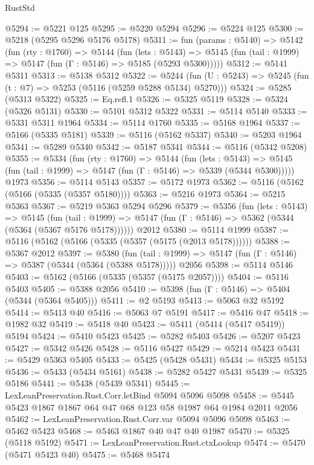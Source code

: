 \begin{lexlean}{RustStd}
\begin{coremodule}
{\begin{coremodule}
{{{{{{{{{{{{{{{{{{{{{{{{{{{{{{{@5294 := @5221 @125
@5295 := @5220 @5294
@5296 := @5224 @125
@5300 := @5218 (@5295 @5296 @5176 @5178)
@5311 := fun (params : @5140) =>
  @5142
    (fun (rty : @1760) =>
    @5144
      (fun (lets : @5143) =>
      @5145 (fun (tail : @1999) => @5147 (fun (Γ : @5146) => @5185 (@5293 @5300)))))
@5312 := @5141 @5311
@5313 := @5138 @5312
@5322 := @5244 (fun (U : @5243) => @5245 (fun (t : @7) => @5253 (@5116 (@5259 @5288 @5134) @5270)))
@5324 := @5285 (@5313 @5322)
@5325 := Eq.refl.{1}
@5326 := @5325 @5119
@5328 := @5324 (@5326 @5131)
@5330 := @5101 @5312 @5322
@5331 := @5114 @5140
@5333 := @5331 @5311 @1964
@5334 := @5114 @1760
@5335 := @5168 @1964
@5337 := @5166 (@5335 @5181)
@5339 := @5116 (@5162 @5337)
@5340 := @5203 @1964
@5341 := @5289 @5340
@5342 := @5187 @5341
@5344 := @5116 (@5342 @5208)
@5355 := @5334
    (fun (rty : @1760) =>
    @5144
      (fun (lets : @5143) =>
      @5145 (fun (tail : @1999) => @5147 (fun (Γ : @5146) => @5339 (@5344 @5300)))))
    @1973
@5356 := @5114 @5143
@5357 := @5172 @1973
@5362 := @5116 (@5162 (@5166 (@5335 (@5357 @5180))))
@5363 := @5216 @1973
@5364 := @5215 @5363
@5367 := @5219 @5363 @5294 @5296
@5379 := @5356
    (fun (lets : @5143) =>
    @5145
      (fun (tail : @1999) => @5147 (fun (Γ : @5146) => @5362 (@5344 (@5364 (@5367 @5176 @5178))))))
    @2012
@5380 := @5114 @1999
@5387 := @5116 (@5162 (@5166 (@5335 (@5357 (@5175 (@2013 @5178))))))
@5388 := @5367 @2012
@5397 := @5380
    (fun (tail : @1999) => @5147 (fun (Γ : @5146) => @5387 (@5344 (@5364 (@5388 @5178)))))
    @2056
@5398 := @5114 @5146
@5403 := @5162 (@5166 (@5335 (@5357 (@5175 @2057))))
@5404 := @5116 @5403
@5405 := @5388 @2056
@5410 := @5398 (fun (Γ : @5146) => @5404 (@5344 (@5364 @5405)))
@5411 := @2 @5193
@5413 := @5063 @32 @5192
@5414 := @5413 @40
@5416 := @5063 @7 @5191
@5417 := @5416 @47
@5418 := @1982 @32
@5419 := @5418 @40
@5423 := @5411 (@5414 (@5417 @5419)) @5194
@5424 := @5410 @5423
@5425 := @5282 @5403
@5426 := @5207 @5423
@5427 := @5342 @5426
@5428 := @5116 @5427
@5429 := @5214 @5423
@5431 := @5429 @5363 @5405
@5433 := @5425 (@5428 @5431)
@5434 := @5325 @5153
@5436 := @5433 (@5434 @5161)
@5438 := @5282 @5427 @5431
@5439 := @5325 @5186
@5441 := @5438 (@5439 @5341)
@5445 := LexLeanPreservation.Rust.Corr.letBind @5094 @5096 @5098
@5458 := @5445 @5423 @1867 @1867 @64 @47 @68 @123 @58 @1987 @64 @1984 @2011 @2056
@5462 := LexLeanPreservation.Rust.Corr.var @5094 @5096 @5098
@5463 := @5462 @5423
@5468 := @5463 @1867 @40 @47 @40 @1987
@5470 := @5325 (@5118 @5192)
@5471 := LexLeanPreservation.Rust.ctxLookup
@5474 := @5470 (@5471 @5423 @40)
@5475 := @5468 @5474
}}}}}}}}}}}}}}}}}}}}}}}}}}}}}}}
\end{coremodule}}
\end{coremodule}
\end{lexlean}
